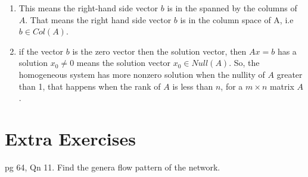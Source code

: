 \documentclass[aima104_lecturenotes_ku.tex]{subfiles}
\begin{document}
  \begin{enumerate}
  \item This means the right-hand side vector \(b\) is in the spanned by the columns of \(A\). That means the right hand side vector \(b\) is in the column space of A, i.e \(b \in Col(A)\).

  \item if the vector \(b\) is the zero vector then the solution vector,
    then \(Ax=b\) has a solution \(x_0 \neq 0\) means the solution vector \(x_0 \in Null(A)\). So, the homogeneous system has more nonzero solution when the nullity of \(A\) greater than 1, that happens when the rank of \(A\) is less than \(n\), for a \(m \times n\) matrix \(A\).
    \end{enumerate}

    \section{Extra Exercises}
    pg 64, Qn 11. Find the genera flow pattern of the network.
\end{document}

